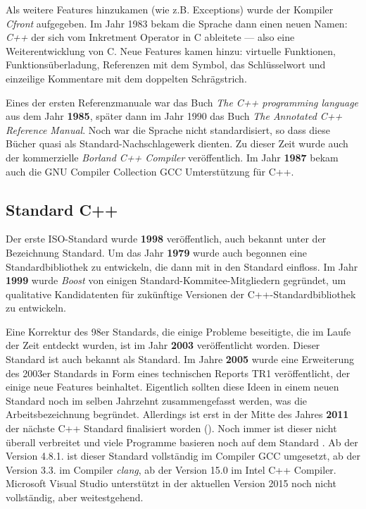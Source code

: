 Als weitere Features hinzukamen (wie z.B. Exceptions) wurde der Kompiler \textit{Cfront} aufgegeben. Im Jahr 1983 bekam die Sprache dann einen neuen Namen: \textit{C++} der sich vom Inkretment Operator in C ableitete --- also eine Weiterentwicklung von C. Neue Features kamen hinzu: virtuelle Funktionen, Funktionsüberladung, Referenzen mit dem \cpp{&} Symbol, das Schlüsselwort  und einzeilige Kommentare mit dem doppelten Schrägstrich.

Eines der ersten Referenzmanuale war das Buch \textit{The C++ programming language} aus dem Jahr \textbf{1985}, später dann im Jahr 1990 das Buch \textit{The Annotated C++ Reference Manual}. Noch war die Sprache nicht standardisiert, so dass diese Bücher quasi als Standard-Nachschlagewerk dienten. Zu dieser Zeit wurde auch der kommerzielle \textit{Borland C++ Compiler} veröffentlich. Im Jahr \textbf{1987} bekam auch die GNU Compiler Collection GCC Umterstützung für C++.

\subsection{Standard C++}
Der erste ISO-Standard wurde \textbf{1998} veröffentlich, auch bekannt unter der Bezeichnung  Standard. Um das Jahr \textbf{1979} wurde auch begonnen eine Standardbibliothek zu entwickeln, die dann mit in den Standard einfloss. Im Jahr \textbf{1999} wurde \textit{Boost} von einigen Standard-Kommitee-Mitgliedern gegründet, um qualitative Kandidatenten für zukünftige Versionen der C++-Standardbibliothek zu entwickeln.

Eine Korrektur des 98er Standards, die einige Probleme beseitigte, die im Laufe der Zeit entdeckt wurden, ist im Jahr \textbf{2003} veröffentlicht worden. Dieser Standard ist auch bekannt als  Standard. Im Jahre \textbf{2005} wurde eine Erweiterung des 2003er Standards in Form eines technischen Reports TR1 veröffentlicht, der einige neue Features beinhaltet. Eigentlich sollten diese Ideen in einem neuen Standard noch im selben Jahrzehnt zusammengefasst werden, was die Arbeitsbezeichnung  begründet. Allerdings ist erst in der Mitte des Jahres \textbf{2011} der nächste C++ Standard finalisiert worden (). Noch immer ist dieser nicht überall verbreitet und viele Programme basieren noch auf dem Standard . Ab der Version 4.8.1. ist dieser Standard vollständig im Compiler GCC umgesetzt, ab der Version 3.3. im Compiler \textit{clang}, ab der Version 15.0 im Intel C++ Compiler. Microsoft Visual Studio unterstützt  in der aktuellen Version 2015 noch nicht vollständig, aber weitestgehend.

